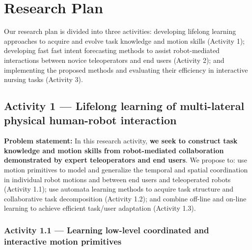 \documentclass[letterpaper, 11 pt, onecolumn]{article}
\begin{document}
\section{Research Plan}\label{sec:plan}

Our research plan is divided into three activities: developing lifelong learning approaches to acquire and evolve task knowledge and motion skills (Activity 1); developing fast fast intent forecasting methods to assist robot-mediated interactions between novice teleoperators and end users (Activity 2); and implementing the proposed methods and evaluating their efficiency in interactive nursing tasks (Activity 3).

\subsection{Activity 1 --- Lifelong learning of multi-lateral physical human-robot interaction}\label{sec:plan-motion}
\noindent


\noindent
{\bf Problem statement:} In this research activity,
{\bf we seek to construct task knowledge and motion skills from robot-mediated collaboration demonstrated by expert teleoperators and end users}. We propose to: use motion primitives to model and generalize the temporal and spatial coordination in individual robot motions and between end users and teleoperated robots (Activity 1.1); use automata learning methods to acquire task structure and collaborative task decomposition (Activity 1.2); and combine off-line and on-line learning to achieve efficient task/user adaptation (Activity 1.3). 

\subsubsection{Activity 1.1 --- Learning low-level coordinated and interactive motion primitives}\label{sec:plan-motion-low}
\end{document}

